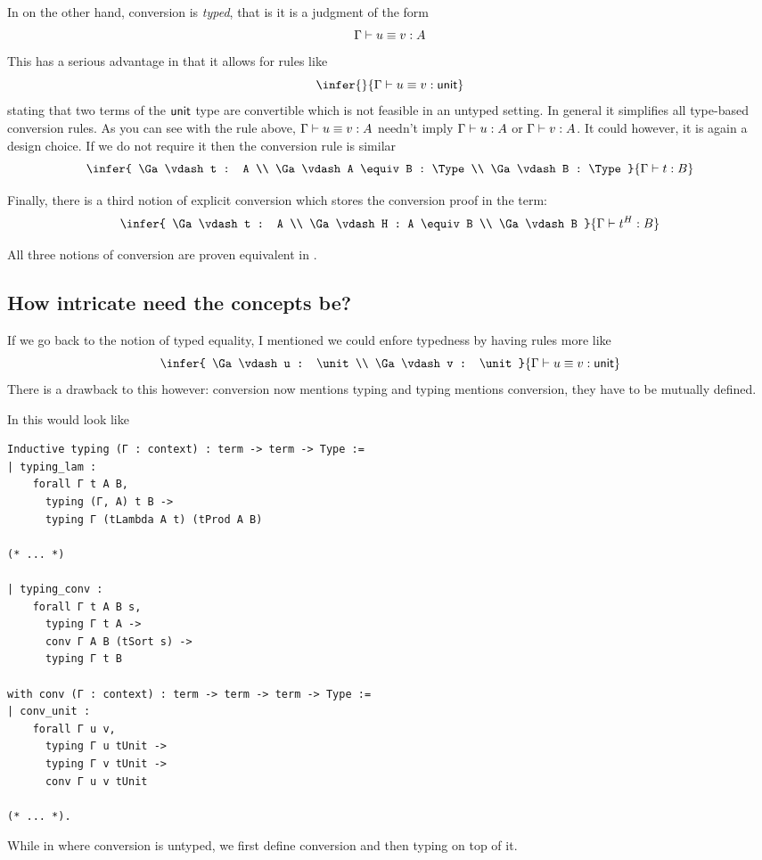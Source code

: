 In \Agda on the other hand, conversion is \emph{typed}, that is it is a judgment
of the form
\[
  \Gamma \vdash u \equiv v : A
\]
This has a serious advantage in that it allows for rules like
\[
  \infer
    { }
    {\Ga \vdash u \equiv v : \unit}
\]
stating that two terms of the \(\mathsf{unit}\) type are convertible which is not
feasible in an untyped setting. In general it simplifies all type-based
conversion rules. As you can see with the rule above,
\(\Gamma \vdash u \equiv v : A\) needn't imply \(\Gamma \vdash u : A\) or
\(\Gamma \vdash v : A\). It could however, it is again a design choice.
If we do not require it then the conversion rule is similar
\[
  \infer
    {
      \Ga \vdash t : A \\
      \Ga \vdash A \equiv B : \Type \\
      \Ga \vdash B : \Type
    }
    {\Ga \vdash t : B}
\]

Finally, there is a third notion of explicit conversion which stores the
conversion proof in the term:
\[
  \infer
    {
      \Ga \vdash t : A \\
      \Ga \vdash H : A \equiv B \\
      \Ga \vdash B
    }
    {\Ga \vdash t^H : B}
\]

All three notions of conversion are proven equivalent in
.

\subsection{How intricate need the concepts be?}

If we go back to the notion of typed equality, I mentioned we could enfore
typedness by having rules more like
\[
  \infer
    {
      \Ga \vdash u : \unit \\
      \Ga \vdash v : \unit
    }
    {\Ga \vdash u \equiv v : \unit}
\]
There is a drawback to this however: conversion now mentions typing and typing
mentions conversion, they have to be mutually defined.

In \Coq this would look like
\begin{verbatim}
Inductive typing (Γ : context) : term -> term -> Type :=
| typing_lam :
    forall Γ t A B,
      typing (Γ, A) t B ->
      typing Γ (tLambda A t) (tProd A B)

(* ... *)

| typing_conv :
    forall Γ t A B s,
      typing Γ t A ->
      conv Γ A B (tSort s) ->
      typing Γ t B

with conv (Γ : context) : term -> term -> term -> Type :=
| conv_unit :
    forall Γ u v,
      typing Γ u tUnit ->
      typing Γ v tUnit ->
      conv Γ u v tUnit

(* ... *).
\end{verbatim}
While in \MetaCoq where conversion is untyped, we first define conversion
and then typing on top of it.

